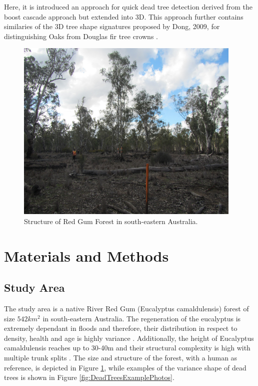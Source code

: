 \documentclass{subfiles}
\begin{document}
Here, it is introduced an approach for quick dead tree detection derived from the boost cascade approach \cite{Viola2001} but extended into 3D. This approach further contains similaries of the 3D tree shape signatures proposed by Dong, 2009, for distinguishing Oaks from Douglas fir tree crowns \cite{Dong2009}. 






	\begin{figure} [h!]
		\centering
		\includegraphics[width=0.965\textwidth]{img/Eucalyptus.png}
		\caption{Structure of Red Gum Forest in south-eastern Australia.}
		\label{fig:EucalyptusSize}
	\end{figure}
	
	
	


\section{Materials and Methods}

\subsection{Study Area}

The study area is a native River Red Gum (Eucalyptus camaldulensis) forest  of size $542km^2$ in south-eastern Australia. The regeneration of the eucalyptus is extremely dependant in floods and therefore, their distribution in respect to density, health and age is highly variance \cite{Kerle2005}. Additionally, the height of Eucalyptus camaldulensis reaches up to 30-40m and their structural complexity is high with multiple trunk splits \cite{Wilson1995}. The size and structure of the forest, with a human as reference, is depicted in Figure \ref{fig:EucalyptusSize}, while examples of the variance shape of dead trees is shown in Figure \ref{fig:DeadTreesExamplePhotos}. 
\end{document}
